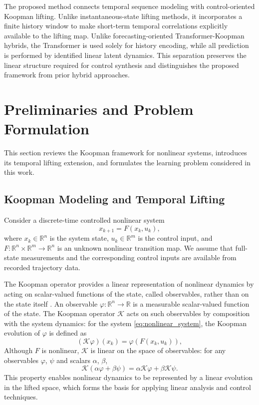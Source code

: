 \documentclass[journal]{IEEEtran}
\begin{document}
The proposed method connects temporal sequence modeling with control-oriented Koopman lifting. Unlike instantaneous-state lifting methods, it incorporates a finite history window to make short-term temporal correlations explicitly available to the lifting map. Unlike forecasting-oriented Transformer-Koopman hybrids, the Transformer is used solely for history encoding, while all prediction is performed by identified linear latent dynamics. This separation preserves the linear structure required for control synthesis and distinguishes the proposed framework from prior hybrid approaches.


\section{Preliminaries and Problem Formulation}
\label{sec:preliminaries_and_problem}

This section reviews the Koopman framework for nonlinear systems, introduces its temporal lifting extension, and formulates the learning problem considered in this work.


\subsection{Koopman Modeling and Temporal Lifting}
\label{sec:preliminary}

Consider a discrete-time controlled nonlinear system
\begin{equation}
    x_{k+1} = F(x_k, u_k),
    \label{eq:nonlinear_system}
\end{equation}
where $x_k \in \mathbb{R}^n$ is the system state, $u_k \in \mathbb{R}^m$ is the control input, and $F:\mathbb{R}^n \times \mathbb{R}^m \to \mathbb{R}^n$ is an unknown nonlinear transition map. We assume that full-state measurements and the corresponding control inputs are available from recorded trajectory data.

The Koopman operator provides a linear representation of nonlinear dynamics by acting on scalar-valued functions of the state, called observables, rather than on the state itself \cite{koopman1931hamiltonian, mezic2005spectral, rowley2009spectral, brunton2022modern}. An observable $\varphi:\mathbb{R}^n\to\mathbb{R}$ is a measurable scalar-valued function of the state. The Koopman operator $\mathcal{K}$ acts on such observables by composition with the system dynamics: for the system \eqref{eq:nonlinear_system}, the Koopman evolution of $\varphi$ is defined as
\begin{equation}
    (\mathcal{K}\varphi)(x_k) = \varphi(F(x_k,u_k)),
    \label{eq:koopman_operator}
\end{equation}
Although $F$ is nonlinear, $\mathcal{K}$ is linear on the space of observables: for any observables $\varphi$, $\psi$ and scalars $\alpha$, $\beta$,
\begin{equation}
    \mathcal{K}(\alpha \varphi + \beta \psi)
    = \alpha \mathcal{K}\varphi + \beta \mathcal{K}\psi.
    \label{eq:koopman_linearity}
\end{equation}
This property enables nonlinear dynamics to be represented by a linear evolution in the lifted space, which forms the basis for applying linear analysis and control techniques.
\end{document}
